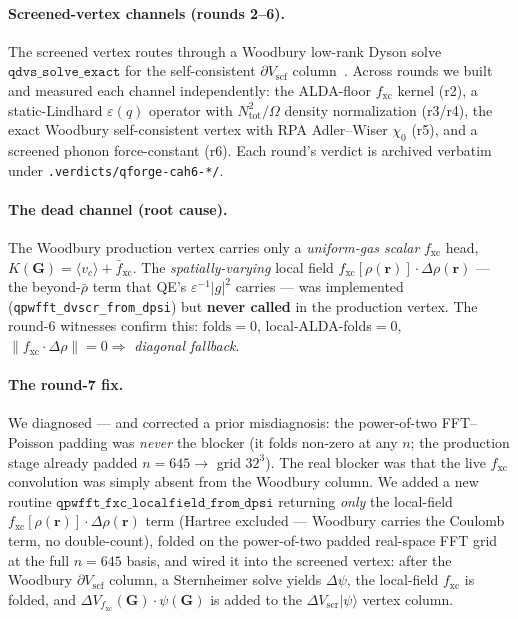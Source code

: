 \documentclass[11pt,a4paper]{article}
\begin{document}
\paragraph{Screened-vertex channels (rounds 2--6).} The screened vertex routes
through a Woodbury low-rank Dyson solve $\mathtt{qdvs\_solve\_exact}$ for the
self-consistent $\partial V_{\mathrm{scf}}$ column~\citep{adler1962,wiser1963}.
Across rounds we built and measured each channel independently: the
ALDA-floor $f_{\mathrm{xc}}$ kernel (r2), a static-Lindhard $\varepsilon(q)$
operator with $N_{\mathrm{tot}}^2/\Omega$ density normalization (r3/r4), the
exact Woodbury self-consistent vertex with RPA Adler--Wiser $\chi_0$ (r5), and
a screened phonon force-constant (r6). Each round's verdict is archived
verbatim under \texttt{.verdicts/qforge-cah6-*/}.

\paragraph{The dead channel (root cause).} The Woodbury production vertex
carries only a \emph{uniform-gas scalar} $f_{\mathrm{xc}}$ head,
$K(\mathbf{G}) = \langle v_c\rangle + \bar{f}_{\mathrm{xc}}$. The
\emph{spatially-varying} local field
$f_{\mathrm{xc}}[\rho(\mathbf{r})]\!\cdot\!\Delta\rho(\mathbf{r})$ --- the
beyond-$\bar{\rho}$ term that QE's $\varepsilon^{-1}|g|^2$ carries --- was
implemented (\texttt{qpwfft\_dvscr\_from\_dpsi}) but \textbf{never called} in
the production vertex. The round-6 witnesses confirm this:
$\mathrm{folds}=0$, local-ALDA-folds$=0$,
$\lVert f_{\mathrm{xc}}\!\cdot\!\Delta\rho\rVert = 0 \Rightarrow$
\emph{diagonal fallback}.

\paragraph{The round-7 fix.} We diagnosed --- and corrected a prior
misdiagnosis: the power-of-two FFT--Poisson padding was \emph{never} the
blocker (it folds non-zero at any $n$; the production stage already padded
$n{=}645 \to$ grid $32^3$). The real blocker was that the live
$f_{\mathrm{xc}}$ convolution was simply absent from the Woodbury column. We
added a new routine $\mathtt{qpwfft\_fxc\_localfield\_from\_dpsi}$ returning
\emph{only} the local-field $f_{\mathrm{xc}}[\rho(\mathbf{r})]\!\cdot\!
\Delta\rho(\mathbf{r})$ term (Hartree excluded --- Woodbury carries the
Coulomb term, no double-count), folded on the power-of-two padded real-space
FFT grid at the full $n{=}645$ basis, and wired it into the screened vertex:
after the Woodbury $\partial V_{\mathrm{scf}}$ column, a Sternheimer solve
yields $\Delta\psi$, the local-field $f_{\mathrm{xc}}$ is folded, and
$\Delta V_{f_{\mathrm{xc}}}(\mathbf{G})\!\cdot\!\psi(\mathbf{G})$ is added to
the $\Delta V_{\mathrm{scr}}|\psi\rangle$ vertex column.
\end{document}
